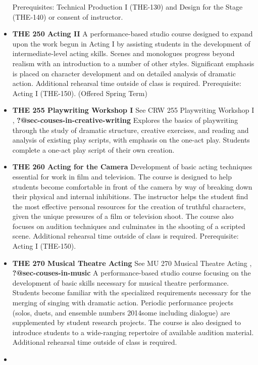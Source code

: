 \documentclass[
  letterpaper,
]{scrbook}
\begin{document}
\begin{itemize}
  Prerequisites: Technical Production I (THE-130) and Design for the
  Stage (THE-140) or consent of instructor.
\item
  \textbf{THE 250 Acting II} A performance-based studio course designed
  to expand upon the work begun in Acting I by assisting students in the
  development of intermediate-level acting skills. Scenes and monologues
  progress beyond realism with an introduction to a number of other
  styles. Significant emphasis is placed on character development and on
  detailed analysis of dramatic action. Additional rehearsal time
  outside of class is required. Prerequisite: Acting I (THE-150).
  (Offered Spring Term)\\
\item
  \textbf{THE 255 Playwriting Workshop I} See CRW 255 Playwriting
  Workshop I , \textbf{?@sec-couses-in-creative-writing} Explores the
  basics of playwriting through the study of dramatic structure,
  creative exercises, and reading and analysis of existing play scripts,
  with emphasis on the one-act play. Students complete a one-act play
  script of their own creation.
\item
  \textbf{THE 260 Acting for the Camera} Development of basic acting
  techniques essential for work in film and television. The course is
  designed to help students become comfortable in front of the camera by
  way of breaking down their physical and internal inhibitions. The
  instructor helps the student find the most effective personal
  resources for the creation of truthful characters, given the unique
  pressures of a film or television shoot. The course also focuses on
  audition techniques and culminates in the shooting of a scripted
  scene. Additional rehearsal time outside of class is required.
  Prerequisite: Acting I (THE-150).\\
\item
  \textbf{THE 270 Musical Theatre Acting} See MU 270 Musical Theatre
  Acting , \textbf{?@sec-couses-in-music} A performance-based studio
  course focusing on the development of basic skills necessary for
  musical theatre performance. Students become familiar with the
  specialized requirements necessary for the merging of singing with
  dramatic action. Periodic performance projects (solos, duets, and
  ensemble numbers 2014some including dialogue) are supplemented by
  student research projects. The course is also designed to introduce
  students to a wide-ranging repertoire of available audition material.
  Additional rehearsal time outside of class is required.
\item

\end{itemize}
\end{document}
